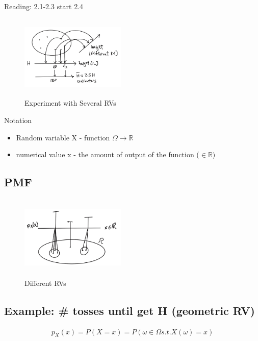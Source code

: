 
 Reading: 2.1-2.3 start 2.4

\begin{figure}[ht]
\centering
\includegraphics[width=5cm, height=4cm]{images/L05/diff_rvs.jpeg}
\caption{Experiment with Several RVs}
\end{figure}

 Notation
\begin{itemize}
    \item Random variable X - function $\Omega \rightarrow \mathbb{R}$
    \item numerical value x - the amount of output of the function ($\in \mathbb{R})$
\end{itemize}

\subsection{PMF}


\begin{figure}[ht]
\centering
\includegraphics[width=5cm, height=4cm]{images/L05/pmf_px.jpeg}
\caption{Different RVs}
\end{figure}

\subsection{Example: \# tosses until get H (geometric RV)}

\begin{align*}
    p_X(x)=P(X=x)=P({\omega \in \Omega s.t. X(\omega)=x})
\end{align*}

